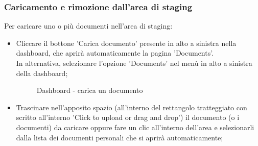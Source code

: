 \documentclass[10pt, a4paper]{article}
\begin{document}
\subsubsection{Caricamento e rimozione dall'area di staging}
Per caricare uno o più documenti nell'area di staging:
\begin{itemize}
    \item Cliccare il bottone 'Carica documento' presente in alto a sinistra nella dashboard, che aprirà automaticamente la pagina 'Documents'.\\
    In alternativa, selezionare l'opzione 'Documents' nel menù in alto a sinistra della dashboard;
    \begin{figure}[H]
        \centering  
        \caption{Dashboard - carica un documento}
        \label{img:dashStageDoc}
    \end{figure}
    \item Trascinare nell'apposito spazio (all'interno del rettangolo tratteggiato con scritto all'interno 'Click to upload or drag and drop') il documento (o i documenti) da caricare oppure fare un clic all'interno dell'area e selezionarli dalla lista dei documenti personali che si aprirà automaticamente;
    \begin{figure}[H]
        \centering  

\end{figure}
\end{itemize}
\end{document}
